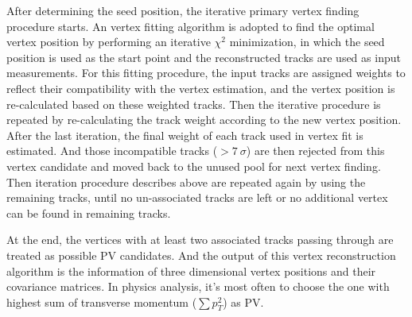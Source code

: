 After determining the seed position, the iterative primary vertex finding procedure starts.
An vertex fitting algorithm is adopted to find the optimal vertex position by performing an iterative $\chi^{2}$ minimization,
in which the seed position is used as the start point and the reconstructed tracks are used as input measurements.
For this fitting procedure, the input tracks are assigned weights to reflect their compatibility with the vertex estimation, and the vertex position is re-calculated based on these weighted tracks.
Then the iterative procedure is repeated by re-calculating the track weight according to the new vertex position.
After the last iteration, the final weight of each track used in vertex fit is estimated. 
And those incompatible tracks ($> 7~\sigma$) are then rejected from this vertex candidate and moved back to the unused pool for next vertex finding.
Then iteration procedure describes above are repeated again by using the remaining tracks, until no un-associated tracks are left or no additional vertex can be found in remaining tracks.

At the end, the vertices with at least two associated tracks passing through are treated as possible PV candidates.
And the output of this vertex reconstruction algorithm is the information of three dimensional vertex positions and their covariance matrices.
In physics analysis, it's most often to choose the one with highest sum of transverse momentum ($\sum{p_{T}^{2}}$) as PV.
